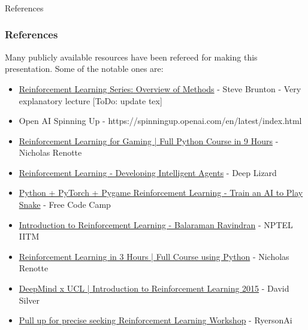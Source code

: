 \begin{frame}[fragile]\frametitle{}
\begin{center}
{\Large References}
\end{center}
\end{frame}

\begin{frame}\frametitle{References}
Many publicly available resources have been refereed for making this presentation. Some of the notable ones are:
\footnotesize
\begin{itemize}
\item \href{https://www.youtube.com/watch?v=i7q8bISGwMQ}{Reinforcement Learning Series: Overview of Methods} - Steve Brunton - Very explanatory lecture [ToDo: update tex]
\item Open AI Spinning Up - https://spinningup.openai.com/en/latest/index.html
\item \href{https://www.youtube.com/watch?v=dWmJ5CXSKdw}{Reinforcement Learning for Gaming | Full Python Course in 9 Hours} - Nicholas Renotte
\item \href{https://www.youtube.com/playlist?list=PLZbbT5o_s2xoWNVdDudn51XM8lOuZ_Njv}{Reinforcement Learning - Developing Intelligent Agents} - Deep Lizard
\item \href{https://www.youtube.com/watch?v=L8ypSXwyBds}{Python + PyTorch + Pygame Reinforcement Learning - Train an AI to Play Snake} - Free Code Camp
\item \href{https://www.youtube.com/playlist?list=PLEAYkSg4uSQ0Hkv_1LHlJtC_wqwVu6RQX}{Introduction to Reinforcement Learning - Balaraman Ravindran} - NPTEL IITM
\item \href{https://www.youtube.com/watch?v=Mut_u40Sqz4}{Reinforcement Learning in 3 Hours | Full Course using Python} - Nicholas Renotte
\item \href{https://www.youtube.com/playlist?list=PLqYmG7hTraZDM-OYHWgPebj2MfCFzFObQ}{DeepMind x UCL | Introduction to Reinforcement Learning 2015} - David Silver
\item \href{https://www.youtube.com/watch?v=8GywDvor9mI}{Pull up for precise seeking Reinforcement Learning Workshop} - RyersonAi
\end{itemize}
\end{frame}

